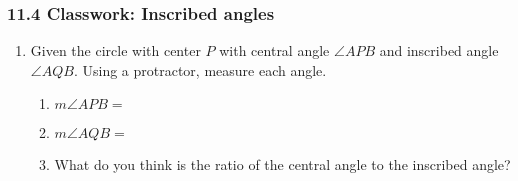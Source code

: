 

\fancyhead[LE]{\thepage}



\subsubsection*{11.4 Classwork: Inscribed angles}
\begin{enumerate}

\item Given the circle with center $P$ with central angle $\angle APB$ and inscribed angle $\angle AQB$. Using a protractor, measure each angle.
\begin{multicols}{2}
  \raggedcolumns
  \begin{enumerate}
    \item $m\angle APB=$ \vspace{0.7cm}
    \item $m\angle AQB=$ \vspace{0.7cm}
    \item What do you think is the ratio of the central angle to the inscribed angle?
  \end{enumerate}
\end{multicols}


\end{enumerate}
